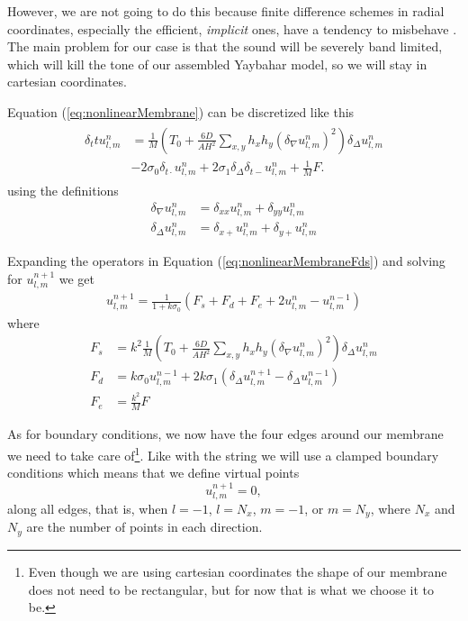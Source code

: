 \documentclass{article}
\begin{document}
However, we are not going to do this because finite difference schemes in radial coordinates, especially the efficient, \textit{implicit} ones, have a tendency to misbehave \cite[Chapter~12]{bilbao_numerical_2009}.
The main problem for our case is that the sound will be severely band limited, which will kill the tone of our assembled Yaybahar model, so we will stay in cartesian coordinates.

Equation (\ref{eq:nonlinearMembrane}) can be discretized like this
\begin{align}
  \label{eq:nonlinearMembraneFds}
  \begin{split}
  \delta_tt u^n_{l, m} &= \frac{1}{M} \left(T_0 + \frac{6D}{A H^2} \sum_{x, y} h_x h_y (\delta_\nabla u^n_{l, m})^2 \right)\delta_\Delta u^n_{l, m} \\
  &- 2 \sigma_0 \delta_{t\cdot} u^n_{l, m} + 2 \sigma_1 \delta_\Delta \delta_{t-} u^n_{l, m} + \frac{1}{M} F.
  \end{split}
\end{align}
using the definitions
\begin{align}
  \delta_\nabla u^n_{l, m} &= \delta_{xx} u^n_{l, m} + \delta_{yy} u^n_{l, m}\\
  \delta_\Delta u^n_{l, m} &= \delta_{x+} u^n_{l, m} + \delta_{y+} u^n_{l, m}
\end{align}

Expanding the operators in Equation (\ref{eq:nonlinearMembraneFds}) and solving for $u^{n+1}_{l, m}$ we get 
\begin{align}
  u^{n+1}_{l, m} = \frac{1}{1 + k\sigma_0} (F_s + F_d + F_e + 2 u^n_{l, m} - u^{n-1}_{l, m})
\end{align}
where
\begin{align}
  F_s &= k^2 \frac{1}{M} \left(T_0 + \frac{6D}{A H^2} \sum_{x, y} h_x h_y(\delta_\nabla u^n_{l, m})^2 \right)\delta_\Delta u^n_{l, m} \\
  F_d &= k \sigma_0 u^{n-1}_{l, m} + 2 k \sigma_1 (\delta_\Delta u^{n+1}_{l, m} - \delta_\Delta u^{n-1}_{l, m}) \\
  F_e &= \frac{k^2}{M} F
\end{align}

As for boundary conditions, we now have the four edges around our membrane we need to take care of\footnote{Even though we are using cartesian coordinates the shape of our membrane does not need to be rectangular, but for now that is what we choose it to be.}.
Like with the string we will use a clamped boundary conditions which means that we define virtual points
\begin{equation}
  u^{n+1}_{l, m} = 0,
\end{equation}
along all edges, that is, when $l = -1$, $l = N_x$, $m = -1$, or $m = N_y$, where $N_x$ and $N_y$ are the number of points in each direction.
\end{document}
